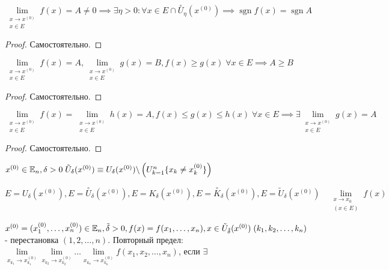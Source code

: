\documentclass[../main.tex]{subfiles}
\begin{document}
\begin{theorem}
    $\lim\limits_{\substack{x\to x^{(0)} \\ x\in E}}f(x)=A\neq 0 \implies \exists \eta >0 : \forall x \in E \cap \overset{\circ}{U}_{\eta}(x^{(0)})\implies \operatorname{sgn}f(x)=\operatorname{sgn}A $
\end{theorem}
\begin{proof}
    Самостоятельно.
\end{proof}
\begin{theorem}
    $\lim\limits_{\substack{x\to x^{(0)} \\ x\in E }} f(x)=A, \lim\limits_{\substack{x\to x^{(0)}\\ x\in E}}g(x) =B, f(x)\geqslant g(x)\; \forall x \in E \implies A\geqslant B  $
\end{theorem}
\begin{proof}
    Самостоятельно.
\end{proof}
\begin{theorem} 
    $\lim\limits_{\substack{x\to x^{(0)}\\x\in E}} f(x)= \lim\limits_{\substack{x\to x^{(0)} \\ x\in E}} h(x)=A, f(x)\leqslant g(x)\leqslant h(x)\;\forall x \in E \implies \exists \lim\limits_{\substack{x \to x^{(0)} \\ x\in E}} g(x)=A   $
\end{theorem}
\begin{proof}
    Самостоятельно.
\end{proof}

\begin{definition}
    $x^{(0)}\in \mathbb{E}_{n}, \delta > 0 \; \tilde{U}_{\delta}(x^{(0)})\equiv U_{\delta}(x^{(0)})\backslash \left(U_{k=1}^{n}\{x_{k}\neq x_{k}^{(0)}\}   \right)$
\end{definition}
$E= U_{\delta}(x^{(0)}), E= \overset{\circ}{U}_{\delta}(x^{(0)}), E = K_{\delta}(x^{(0)}), E= \overset{\circ}{K}_{\delta}(x^{(0)}), E = \tilde{U}_{\delta}(x^{(0)})\quad \lim\limits_{\substack{x\to x_{0} \\ (x\in E)}} f(x) $

\begin{definition}
    $x^{(0)}=(x_{1}^{(0)},\dots,x_{n}^{(0)})\in \mathbb{E}_{n},\tilde{\delta}>0, f(x)=f(x_{1},\dots,x_{n}),x\in \tilde{U}_{\tilde{\delta}}(x^{(0)})\;(k_{1},k_{2},\dots,k_{n})$ - перестановка $(1,2,\dots,n)$. Повторный предел: $\lim\limits_{x_{k_{1}}\to x_{k_{1}}^{(0)}}\lim\limits_{x_{k_{2}}\to x_{k_{2}}^{(0)}}\dots \lim\limits_{x_{k_{n}}\to x_{k_{n}}^{(0)}} f(x_{1},x_{2},\dots,x_{n})$, если $\exists$
\end{definition}
\end{document}
